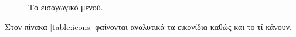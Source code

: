 \documentclass{assignment}
\begin{document}
\begin{figure}
\begin{center}
\caption{Το εισαγωγικό μενού.}
\label{fig:menu:general}
\end{center}
\end{figure}

Στον πίνακα \ref{table:icons} φαίνονται αναλυτικά τα εικονίδια καθώς και το τί κάνουν.
\end{document}

